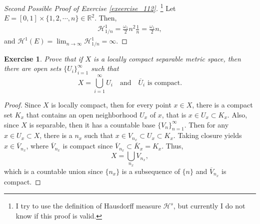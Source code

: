 \documentclass[11pt]{book}
\newtheorem{exercise}{Exercise}[chapter]
\theoremstyle{definition}
\numberwithin{equation}{chapter}
\begin{document}
\begin{proof}[Second Possible Proof of Exercise \ref{exeercise_112}]\footnote{I try to use the definition of Hausdorff measure $\mathcal{H}^s$, but currently I do not know if this proof is valid.} Let $E = [0,1] \times \{1,2,\cdots, n\} \in \mathbb{R}^2$. Then,
\begin{align*}
    \mathcal{H}^1_{1/n} = \frac{\omega_1}{2} n^2 \frac{1}{n} = \frac{\omega_1}{2} n,
\end{align*}
and $\mathcal{H}^1(E) = \lim_{n\to\infty} \mathcal{H}^1_{1/n} = \infty$.
\end{proof}

\medskip

\begin{exercise}
Prove that if $X$ is a locally compact separable metric space, then there are open sets $\{U_i\}_{i=1}^\infty$ such that
$$
X=\bigcup_{i=1}^\infty U_i
\quad
\text{and}
\quad
\text{$\overline{U}_i$ is compact.}
$$
\end{exercise}
\begin{proof}
Since $X$ is locally compact, then for every point $x \in X$, there is a compact set $K_x$ that contains an open neighborhood $U_x$ of $x$, that is $x \in U_x \subset K_x$. Also, since $X$ is separable, then it has a countable base $\{V_n \}^\infty_{n=1}$. Then for any $x \in U_x \subset X$, there is a $n_x$ such that $x \in V_{n_x} \subset U_x \subset K_x$. Taking closure yields $x \in \overline{V}_{n_x}$, where $\overline{V}_{n_x}$ is compact since $\overline{V}_{n_x} \subset \overline{K}_x = K_x$. Thus, $$X = \bigcup_{n_x} V_{n_x},$$ which is a countable union since $\{n_x\}$ is a subsequence of $\{n\}$ and $\overline{V}_{n_x}$ is compact.
\end{proof}

\medskip
\end{document}
